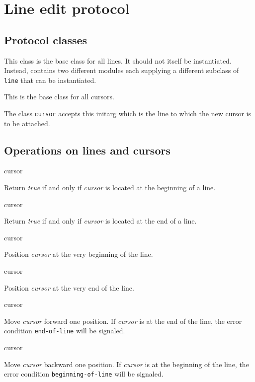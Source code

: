 \section{Line edit protocol}
\label{sec-edit-protocol}

\subsection{Protocol classes}


This class is the base class for all lines.  It should not itself be
instantiated.  Instead, \sysname{} contains two different modules
each supplying a different subclass of \texttt{line} that can be
instantiated.


This is the base class for all cursors.


The class \texttt{cursor} accepts this initarg which is the line to
which the new cursor is to be attached.

\subsection{Operations on lines and cursors}

 {cursor}

Return \textit{true} if and only if \textit{cursor} is located at the
beginning of a line.

 {cursor}

Return \textit{true} if and only if \textit{cursor} is located at the
end of a line.

 {cursor}

Position \textit{cursor} at the very beginning of the line.

 {cursor}

Position \textit{cursor} at the very end of the line.

 {cursor}

Move \textit{cursor} forward one position.  If \emph{cursor} is at the
end of the line, the error condition \texttt{end-of-line} will be
signaled.

 {cursor}

Move \textit{cursor} backward one position.  If \emph{cursor} is at
the beginning of the line, the error condition
\texttt{beginning-of-line} will be signaled.

